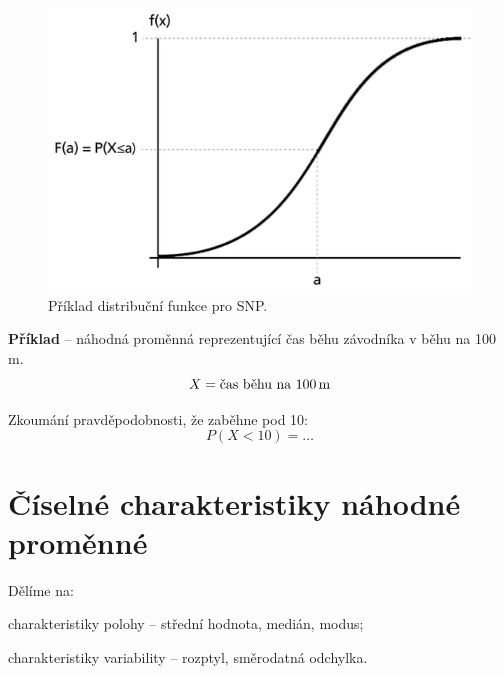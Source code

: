 \begin{compactitem}
    \begin{figure}[H]
        \centering
        \includegraphics[width=0.5\linewidth]{snp_distribution_function.png}
        \caption{Příklad distribuční funkce pro SNP.}
    \end{figure}

    \item \textbf{Příklad} -- náhodná proměnná reprezentující čas běhu závodníka v běhu na 100\,m.
    $$ X = \text{čas běhu na 100\,m} $$ \begin{compactitem}
        \item Zkoumání pravděpodobnosti, že zaběhne pod 10:
            $$ P(X < 10) = \ldots$$
    \end{compactitem}

\end{compactitem}


\section{Číselné charakteristiky náhodné proměnné}

\begin{compactitem}
    \item Dělíme na: \begin{compactitem}
        \item charakteristiky polohy -- střední hodnota, medián, modus;
        \item charakteristiky variability -- rozptyl, směrodatná odchylka.
    \end{compactitem}
\end{compactitem}

